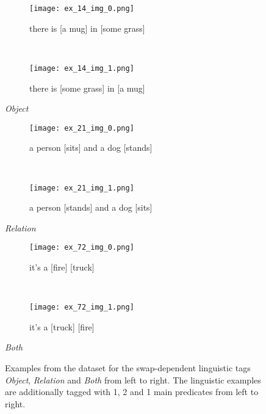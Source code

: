 \begin{figure}[ht]
\centering
    \begin{minipage}[t]{.30\textwidth}
        \begin{subfigure}[t]{\textwidth}
        \centering
        \texttt{[image: ex\_14\_img\_0.png]}
        \caption{there is [a mug] in [some grass]}
        \end{subfigure}\\
        \begin{subfigure}[t]{\textwidth}
        \centering
        \texttt{[image: ex\_14\_img\_1.png]}
        \caption{there is [some grass] in [a mug]}
        \end{subfigure}%
        \caption*{\textit{Object}}
    \end{minipage}
    \hfill
    \begin{minipage}[t]{.30\textwidth}
        \begin{subfigure}[t]{\textwidth}
        \centering
        \texttt{[image: ex\_21\_img\_0.png]}
        \caption{a person [sits] and a dog [stands]}
        \end{subfigure}\\
        \begin{subfigure}[t]{\textwidth}
        \centering
        \texttt{[image: ex\_21\_img\_1.png]}
        \caption{a person [stands] and a dog [sits]}
        \end{subfigure}%
        \caption*{\textit{Relation}}
    \end{minipage}
    \hfill
    \begin{minipage}[t]{.30\textwidth}
        \begin{subfigure}[t]{\textwidth}
        \centering
        \texttt{[image: ex\_72\_img\_0.png]}
        \caption{it's a [fire] [truck]}
        \end{subfigure}\\
        \begin{subfigure}[t]{\textwidth}
        \centering
        \texttt{[image: ex\_72\_img\_1.png]}
        \caption{it's a [truck] [fire]}
        \end{subfigure}%
        \caption*{\textit{Both}}
    \end{minipage}%
    \caption{Examples from the dataset for the swap-dependent linguistic tags \textit{Object}, \textit{Relation} and \textit{Both} from left to right. The linguistic examples are additionally tagged with 1, 2 and 1 main predicates from left to right.}
    \label{fig:dataset-examples-linguistic}
\end{figure}

